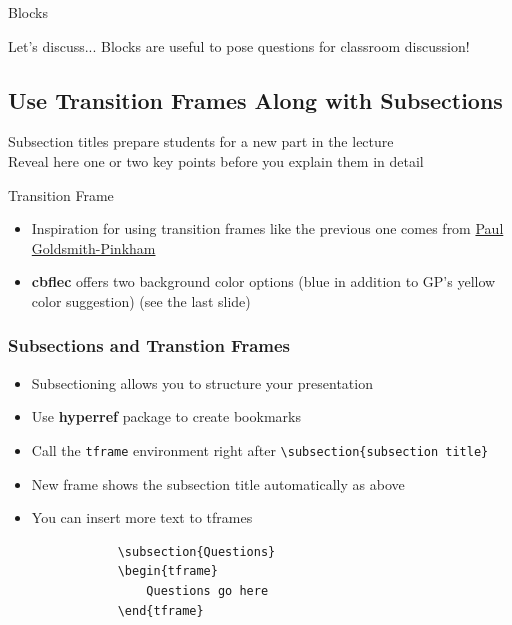 \documentclass[11pt, aspectratio=43]{beamer}
\begin{document}
\begin{frame}{Blocks}
    \begin{block}{Let's discuss...}
        Blocks are useful to pose questions for classroom discussion!
    \end{block}
\end{frame}

\subsection{Use Transition Frames Along with Subsections}
\begin{tframe}
    Subsection titles prepare students for a new part in the lecture\\[2ex]
    Reveal here one or two key points before you explain them in detail 
\end{tframe}

\begin{frame}{Transition Frame}
    \begin{itemize}
        \item Inspiration for using transition frames like the previous one comes from \href{https://paulgp.github.io/beamer_tips.pdf}{Paul Goldsmith-Pinkham}
        \item \textbf{cbflec} offers two background color options (blue in addition to GP's yellow color suggestion) (see the last slide)
    \end{itemize}
\end{frame}

\begin{frame}[fragile]
    \frametitle{Subsections and Transtion Frames}
    \begin{itemize}
        \item Subsectioning allows you to structure your presentation
        \item Use \textbf{hyperref} package to create bookmarks 
        \item Call the \verb!tframe! environment right after \verb|\subsection{subsection title}|
        \item New frame shows the subsection title automatically as above
        \item You can insert more text to tframes
        \begin{verbatim}
            \subsection{Questions}
            \begin{tframe}
                Questions go here
            \end{tframe}
        \end{verbatim}
    \end{itemize}
\end{frame}
\end{document}
